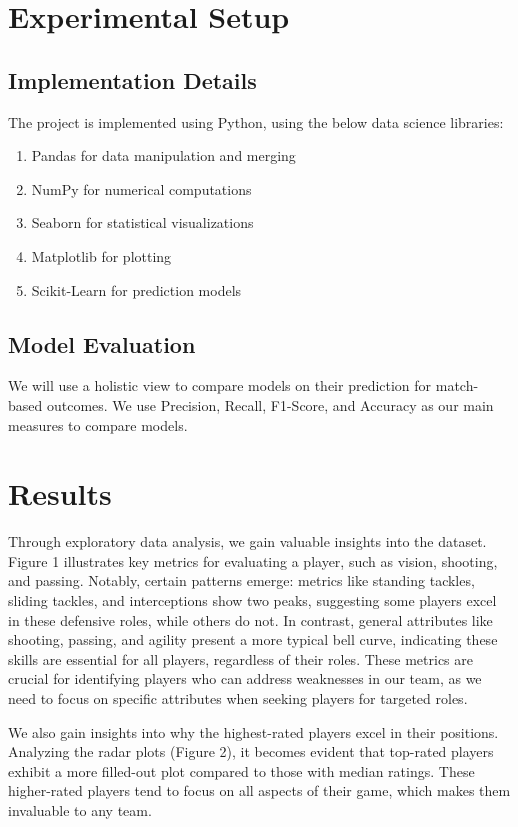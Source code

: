 \documentclass{article}
\begin{document}
\section{Experimental Setup}


\subsection{Implementation Details}
The project is implemented using Python, using the below data science libraries:
\begin{enumerate}
    \item Pandas for data manipulation and merging
    \item NumPy for numerical computations
    \item Seaborn for statistical visualizations
    \item Matplotlib for plotting
    \item Scikit-Learn for prediction models
\end{enumerate}

\subsection{Model Evaluation}
We will use a holistic view to compare models on their prediction for match-based outcomes. We use Precision, Recall, F1-Score, and Accuracy as our main measures to compare models.


\section{Results}
\label{others}
Through exploratory data analysis, we gain valuable insights into the dataset. Figure 1 illustrates key metrics for evaluating a player, such as vision, shooting, and passing. Notably, certain patterns emerge: metrics like standing tackles, sliding tackles, and interceptions show two peaks, suggesting some players excel in these defensive roles, while others do not. In contrast, general attributes like shooting, passing, and agility present a more typical bell curve, indicating these skills are essential for all players, regardless of their roles. These metrics are crucial for identifying players who can address weaknesses in our team, as we need to focus on specific attributes when seeking players for targeted roles.

We also gain insights into why the highest-rated players excel in their positions. Analyzing the radar plots (Figure 2), it becomes evident that top-rated players exhibit a more filled-out plot compared to those with median ratings. These higher-rated players tend to focus on all aspects of their game, which makes them invaluable to any team.
\end{document}
